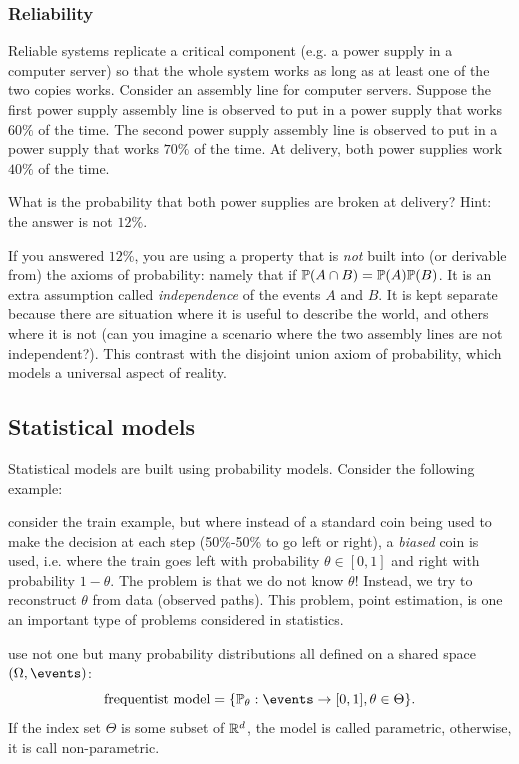 \documentclass{article}
\begin{document}
\subsubsection{Reliability}\label{sec:reliability}

Reliable systems replicate a critical component (e.g. a power supply in a computer server) so that the whole system works as long as at least one of the two copies works. Consider an assembly line for computer servers. Suppose the first power supply assembly line is observed to put in a power supply that works $60\%$ of the time. The second  power supply assembly line  is observed to put in a power supply that works $70\%$ of the time. At delivery, both power supplies work $40\%$ of the time. 

 What is the probability that both power supplies are broken at delivery? Hint: the answer is not $12\%$. 

If you answered $12\%$, you are using a property that is \emph{not} built into (or derivable from) the axioms of probability: namely that if $\P(A \cap B) = \P(A) \P(B)$. It is an extra assumption called \emph{independence} of the events $A$ and $B$. It is kept separate because there are situation where it is useful to describe the world, and others where it is not (can you imagine a scenario where the two assembly lines are not independent?). This contrast with the disjoint union axiom of probability, which models a universal aspect of reality. 


\subsection{Statistical models}

Statistical models are built using probability models. Consider the following example:

 consider the train example, but where instead of a standard coin being used to make the decision at each step (50\%-50\% to go left or right), a \emph{biased} coin is used, i.e. where the train goes left with probability $\theta\in [0, 1]$ and right with probability $1 - \theta$. The problem is that we do not know $\theta$! Instead, we try to reconstruct $\theta$ from data (observed paths). This problem, point estimation, is one an important type of problems considered in statistics. 

 use not one but many probability distributions all defined on a shared space $(\Omega, \events)$:
\[ \text{frequentist model} = \{ \P_\theta : \events \to [0, 1], \theta \in \Theta\}. \]
If the index set $\Theta$ is some subset of $\R^d$, the model is called parametric, otherwise, it is call non-parametric.
\end{document}
